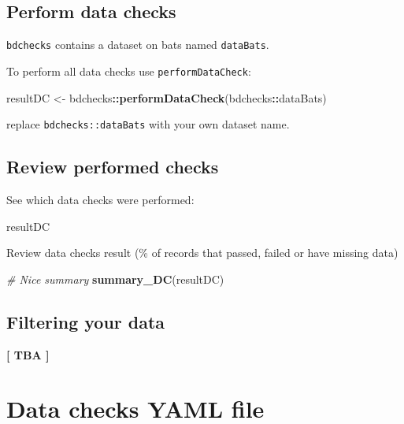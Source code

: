 \documentclass[]{book}
\newenvironment{Shaded}{\begin{snugshade}}{\end{snugshade}}
\newcommand{\KeywordTok}[1]{\textcolor[rgb]{0.13,0.29,0.53}{\textbf{#1}}}
\newcommand{\StringTok}[1]{\textcolor[rgb]{0.31,0.60,0.02}{#1}}
\newcommand{\CommentTok}[1]{\textcolor[rgb]{0.56,0.35,0.01}{\textit{#1}}}
\newcommand{\OperatorTok}[1]{\textcolor[rgb]{0.81,0.36,0.00}{\textbf{#1}}}
\newcommand{\NormalTok}[1]{#1}
\theoremstyle{definition}
\theoremstyle{definition}
\theoremstyle{definition}
\theoremstyle{remark}
\begin{document}
\section{Perform data checks}\label{perform-data-checks}

\texttt{bdchecks} contains a dataset on bats named \texttt{dataBats}.

To perform all data checks use \texttt{performDataCheck}:

\begin{Shaded}
\begin{Highlighting}[]
\NormalTok{resultDC <-}\StringTok{ }\NormalTok{bdchecks}\OperatorTok{::}\KeywordTok{performDataCheck}\NormalTok{(bdchecks}\OperatorTok{::}\NormalTok{dataBats)}
\end{Highlighting}
\end{Shaded}

replace \texttt{bdchecks::dataBats} with your own dataset name.

\section{Review performed checks}\label{review-performed-checks}

See which data checks were performed:

\begin{Shaded}
\begin{Highlighting}[]
\NormalTok{resultDC}
\end{Highlighting}
\end{Shaded}

Review data checks result (\% of records that passed, failed or have
missing data)

\begin{Shaded}
\begin{Highlighting}[]
\CommentTok{# Nice summary}
\KeywordTok{summary_DC}\NormalTok{(resultDC)}
\end{Highlighting}
\end{Shaded}

\section{Filtering your data}\label{filtering-your-data}

\textbf{{{[} TBA {]}}}

\hypertarget{data-checks-yaml-file}{\chapter{Data checks YAML
file}\label{data-checks-yaml-file}}
\end{document}
